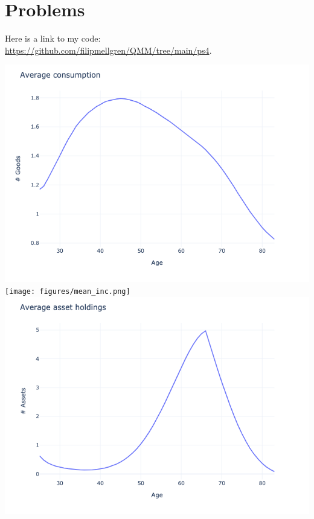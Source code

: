 \section{Problems}

Here is a link to my code: \url{https://github.com/filipmellgren/QMM/tree/main/ps4}.

\begin{questions}
\begin{solution}
\includegraphics[scale=0.5]{figures/mean_cons.png}
\texttt{[image: figures/mean\_inc.png]}
\includegraphics[scale=0.5]{figures/mean_assets.png}

\end{solution}
\end{questions}
